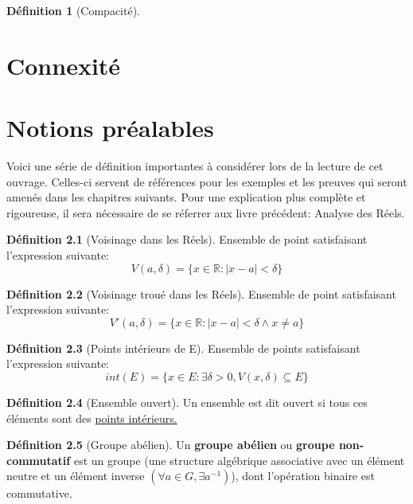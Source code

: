 \documentclass[12pt]{book}
\let\Bbb\mathbb
\theoremstyle{definition}
\newtheorem{definition}{Définition}[section]
\begin{document}
\begin{definition}[Compacité]
    
\end{definition}
\chapter{Connexité}

\appendix
\chapter{Notions préalables}
Voici une série de définition importantes à considérer lors de la lecture de cet ouvrage. Celles-ci servent
de références pour les exemples et les preuves qui seront amenés dans les chapitres suivants. Pour une explication
plus complète et rigoureuse, il sera nécessaire de se réferrer aux livre précédent: Analyse des Réels.

\begin{definition}[Voisinage dans les Réels]
    \label{def:voisinage_reels}
    Ensemble de point satisfaisant l'expression
    suivante: $$V(a, \delta) = \{ x \in \Bbb R : |x - a| < \delta \}$$
\end{definition}

\begin{definition}[Voisinage troué dans les Réels]
    \label{def:voisinage_troue_reels}
    Ensemble de point satisfaisant l'expression
    suivante: $$V'(a, \delta) = \{ x \in \Bbb R : |x - a| < \delta \land x \neq a \}$$
\end{definition}

\begin{definition}[Points intérieurs de E]
    \label{def:point_int}
    Ensemble de points satisfaisant l'expression
    suivante: $$int(E) = \{ x \in E : \exists \delta > 0, V(x, \delta) \subseteq E \} $$
\end{definition}

\begin{definition}[Ensemble ouvert]
    \label{def:ensemble_ouvert}
    Un ensemble est dit ouvert si tous ces éléments sont des \hyperref[def:point_int]{points intérieurs.}
\end{definition}

\begin{definition}[Groupe abélien]
    \label{def:groupe_abelien}
    Un \textbf{groupe abélien} ou \textbf{groupe non-commutatif} est un groupe
    (une structure algébrique associative avec un élément neutre et un élément inverse $(\forall a \in G, \exists a^{-1})$), 
    dont l'opération binaire est commutative.
\end{definition}
\end{document}

